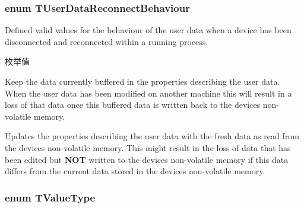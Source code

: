 \hypertarget{group___common_interface_ga75776c64a8383014d608b9845708aee2}{
\subsubsection[{T\+User\+Data\+Reconnect\+Behaviour}]{\setlength{\rightskip}{0pt plus 5cm}enum {\bf T\+User\+Data\+Reconnect\+Behaviour}}}\label{group___common_interface_ga75776c64a8383014d608b9845708aee2}


Defined valid values for the behaviour of the user data when a device has been disconnected and reconnected within a running process. 

\begin{Desc}
\item[枚举值]\par
\begin{description}
\item[{\em 
\hypertarget{group___common_interface_gga75776c64a8383014d608b9845708aee2a7e0bcf00ebcd23e0c1d947a4b2d795d9}{udrb\+Keep\+Cached\+Data}\label{group___common_interface_gga75776c64a8383014d608b9845708aee2a7e0bcf00ebcd23e0c1d947a4b2d795d9}
}]Keep the data currently buffered in the properties describing the user data. When the user data has been modified on another machine this will result in a loss of that data once this buffered data is written back to the devices non-\/volatile memory. \item[{\em 
\hypertarget{group___common_interface_gga75776c64a8383014d608b9845708aee2a1fe0e50c8985d5571f40bf340da0005c}{udrb\+Update\+From\+Device\+Data}\label{group___common_interface_gga75776c64a8383014d608b9845708aee2a1fe0e50c8985d5571f40bf340da0005c}
}]Updates the properties describing the user data with the fresh data as read from the devices non-\/volatile memory. This might result in the loss of data that has been edited but {\bfseries N\+O\+T} written to the devices non-\/volatile memory if this data differs from the current data stored in the devices non-\/volatile memory. \end{description}
\end{Desc}
\hypertarget{group___common_interface_ga2d7aada98767e89f487b57c388a5859d}{
\subsubsection[{T\+Value\+Type}]{\setlength{\rightskip}{0pt plus 5cm}enum {\bf T\+Value\+Type}}}\label{group___common_interface_ga2d7aada98767e89f487b57c388a5859d}


